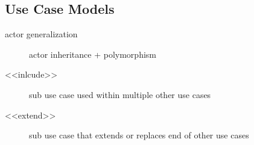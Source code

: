 \documentclass[]{article}
\theoremstyle{definition}
\begin{document}
	\subsection{Use Case Models}
	\begin{description}
		\item[actor generalization] actor inheritance + polymorphism
		\item[<<inlcude>>] sub use case used within multiple other use cases
		\item[<<extend>>] sub use case that extends or replaces end of other use cases
	\end{description}
\end{document}
